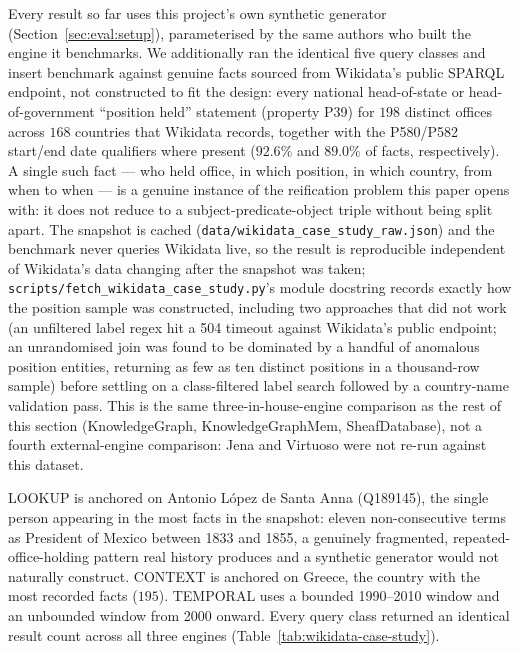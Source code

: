 Every result so far uses this project's own synthetic generator
(Section~\ref{sec:eval:setup}), parameterised by the same authors who
built the engine it benchmarks. We additionally ran the identical five
query classes and insert benchmark against \wikidatanumfacts{} genuine
facts sourced from Wikidata's public SPARQL endpoint, not constructed to
fit the design: every national head-of-state or head-of-government
``position held'' statement (property P39) for $198$ distinct offices
across $168$ countries that Wikidata records, together with the P580/P582
start/end date qualifiers where present ($92.6\%$ and $89.0\%$ of facts,
respectively). A single such fact --- who held office, in which
position, in which country, from when to when --- is a genuine instance
of the reification problem this paper opens with: it does not reduce to
a subject-predicate-object triple without being split apart. The
snapshot is cached (\texttt{data/wikidata\_case\_study\_raw.json}) and the
benchmark never queries Wikidata live, so the result is reproducible
independent of Wikidata's data changing after the snapshot was taken;
\texttt{scripts/fetch\_wikidata\_case\_study.py}'s module docstring
records exactly how the position sample was constructed, including two
approaches that did not work (an unfiltered label regex hit a 504
timeout against Wikidata's public endpoint; an unrandomised join was
found to be dominated by a handful of anomalous position entities,
returning as few as ten distinct positions in a thousand-row sample)
before settling on a class-filtered label search followed by a
country-name validation pass. This is the same three-in-house-engine
comparison as the rest of this section (KnowledgeGraph, KnowledgeGraphMem,
SheafDatabase), not a fourth external-engine comparison: Jena and
Virtuoso were not re-run against this dataset.

LOOKUP is anchored on Antonio L\'opez de Santa Anna (Q189145), the
single person appearing in the most facts in the snapshot: eleven
non-consecutive terms as President of Mexico between 1833 and 1855, a
genuinely fragmented, repeated-office-holding pattern real history
produces and a synthetic generator would not naturally construct.
CONTEXT is anchored on Greece, the country with the most recorded facts
($195$). TEMPORAL uses a bounded 1990--2010 window and an unbounded
window from 2000 onward. Every query class returned an identical result
count across all three engines (Table~\ref{tab:wikidata-case-study}).



